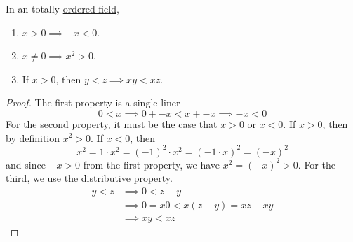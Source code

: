   \begin{theorem}
    \label{thm:properties-of-an-ordered-field}
    In an totally \hyperref[def:ordered-field]{ordered field}, 
    \begin{enumerate}
      \item $x > 0 \implies -x < 0$. 
      \item $x \neq 0 \implies x^2 > 0$. 
      \item If $x > 0$, then $y < z \implies xy < xz$. 
    \end{enumerate}
  \end{theorem} 
  \begin{proof}
    The first property is a single-liner 
    \begin{equation}
      0 < x \implies 0 + -x < x + -x \implies -x < 0 
    \end{equation}
    For the second property, it must be the case that $x > 0$ or $x < 0$. If $x > 0$, then by definition $x^2 > 0$. If $x < 0$, then 
    \begin{equation}
      x^2 = 1 \cdot x^2 = (-1)^2 \cdot x^2 = (-1 \cdot x)^2 = (-x)^2
    \end{equation}
    and since $-x > 0$ from the first property, we have $x^2 = (-x)^2 > 0$. For the third, we use the distributive property. 
    \begin{align}
      y < z & \implies 0 < z - y \\ 
            & \implies 0 = x 0 < x(z - y) = xz - xy \\
            & \implies xy < xz
    \end{align}
  \end{proof}

